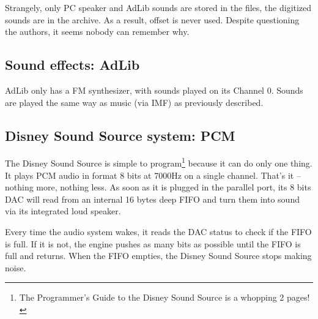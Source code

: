 \par
\begin{minipage}{\textwidth}

\end{minipage}
\par
Strangely, only PC speaker and AdLib sounds are stored in the  files, the digitized sounds are in the  archive. As a result, offset  is never used. Despite questioning the authors, it seems nobody can remember why.\\

\par



\subsection{Sound effects: AdLib}
AdLib only has a FM synthesizer, with sounds played on its Channel 0. Sounds are played the same way as music (via IMF) as previously described.












\subsection{Disney Sound Source system: PCM}
The Disney Sound Source is simple to program\footnote{The Programmer's Guide to the Disney Sound Source is a whopping 2 pages!} because it can do only one thing. It plays PCM audio in format 8 bits at 7000Hz on a single channel. That's it -- nothing more, nothing less. As soon as it is plugged in the parallel port, its 8 bits DAC will read from an internal 16 bytes deep FIFO and turn them into sound via its integrated loud speaker.\\ 
\par
Every time the audio system wakes, it reads the DAC status to check if the FIFO is full. If it is not, the engine pushes as many bits as possible until the FIFO is full and returns. When the FIFO empties, the Disney Sound Source stops making noise.\\
\par










